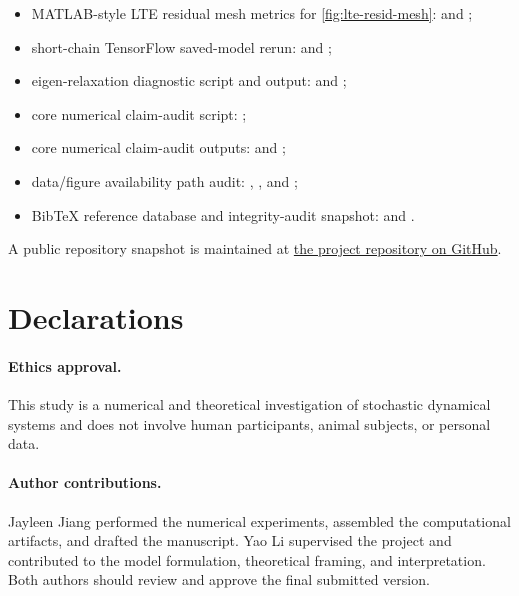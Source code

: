 \documentclass[11pt,a4paper]{article}
\theoremstyle{definition}
\numberwithin{equation}{section}   %
\begin{document}
\begin{itemize}[leftmargin=*]
  ;
  \item MATLAB-style LTE residual mesh metrics for \cref{fig:lte-resid-mesh}:
  and
  ;
  \item short-chain TensorFlow saved-model rerun:
  and ;
  \item eigen-relaxation diagnostic script and output:
   and
  ;
  \item core numerical claim-audit script:
  ;
  \item core numerical claim-audit outputs:
   and
  ;
  \item data/figure availability path audit:
  ,
  , and
  ;
  \item BibTeX reference database and integrity-audit snapshot:
   and
  .
\end{itemize}
\endgroup
A public repository snapshot is maintained at
\href{https://github.com/jayleenjiang/nls-energy-cascade}{the project
repository on GitHub}.

\section*{Declarations}

\paragraph{Ethics approval.}
This study is a numerical and theoretical investigation of stochastic
dynamical systems and does not involve human participants, animal subjects, or
personal data.

\paragraph{Author contributions.}
Jayleen Jiang performed the numerical experiments, assembled the computational
artifacts, and drafted the manuscript. Yao Li supervised the project and
contributed to the model formulation, theoretical framing, and interpretation.
Both authors should review and approve the final submitted version.
\end{document}

